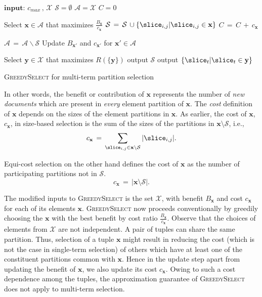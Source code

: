\begin{algorithm}[h!]
  \begin{algorithmic}[1]
    \STATE $\textbf{input: } c_{max}\, ,\, \mathcal{X}$
    \STATE $\mathcal{S} = \emptyset$ 
    \STATE $\mathcal{A} = \mathcal{X}$
    \STATE $C = 0$
    
    \STATE \REPEAT 
    \STATE Select $\mathbf{x} \in \mathcal{A}$ that
    maximizes $\frac{B_\mathbf{x}}{c_\mathbf{x}}$ 
    \STATE $\mathcal{S} \,= \,\mathcal{S} \,\cup \{ \slice_{i,j} | \slice_{i,j} \in \mathbf{x}\}$ 
    \STATE $C \,= \,C \,+ \,c_\mathbf{x}$
    \ENDIF
    
    \STATE $\mathcal{A} \,= \,\mathcal{A} \backslash \mathcal{S}$
    \STATE Update $B_\mathbf{x'}$ and $c_\mathbf{x'}$ for $\mathbf{x'} \in \mathcal{A}$
     \STATE
    
    \STATE Select $\mathbf{y} \in \mathcal{X}$ that maximizes $R(\{\mathbf{y}\})$
    \STATE output $\mathcal{S}$ 
    \ELSE \STATE output $ \{\slice_{t} | \slice_{t} \in \mathbf{y}\} $
    \ENDIF
  \end{algorithmic}
    
  \caption{\textsc{GreedySelect} for multi-term partition selection}
  \label{alg:GreedySelection_multiterms}
\end{algorithm}

In other words, the benefit or contribution of $\mathbf{x}$ represents the number of \emph{new documents} which are present in \emph{every} element partition of $\mathbf{x}$. The \emph{cost} definition of $\mathbf{x}$ depends on the sizes of the element partitions in $\mathbf{x}$. As earlier, the cost of $\mathbf{x}$, $c_\mathbf{x}$, in size-based selection is the sum of the sizes of the partitions in $\mathbf{x} \setminus \mathcal{S}$, i.e.,
$$
 c_\mathbf{x} \,=\,  \sum_{\slice_{i,j} \in \mathbf{x} \setminus \mathcal{S}}|\slice_{i,j}|.
$$ 

Equi-cost selection on the other hand defines the cost of $\mathbf{x}$ as the number of participating partitions not in $\mathcal{S}$. 
$$
 c_\mathbf{x} \,=\, \left|  \mathbf{x} \setminus \mathcal{S} \right|.
$$ 

The modified inputs to \textsc{GreedySelect} is the set $\mathcal{X}$, with benefit $B_\mathbf{x}$ and cost $c_\mathbf{x}$ for each of its elements $\mathbf{x}$. \textsc{GreedySelect} now proceeds conventionally by greedily choosing the
$\mathbf{x}$ with the best benefit by cost ratio $\frac{B_\mathbf{x}}{c_\mathbf{x}}$. Observe that the choices of elements from $\mathcal{X}$ are not independent. A pair of tuples can share the same partition. Thus, selection of a tuple $\mathbf{x}$ might result in reducing the cost (which is not the case in single-term selection) of
others which have at least one of the constituent partitions common
with $\mathbf{x}$. Hence in the update step apart from updating the benefit of $\mathbf{x}$, we also update its cost $c_\mathbf{x}$. 
Owing to such a cost dependence among the tuples, the approximation guarantee of \textsc{GreedySelect} does not apply to multi-term selection.

